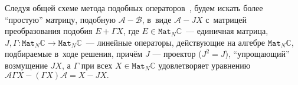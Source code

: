 \documentclass[14pt,a4paper]{extarticle}
\theoremstyle{definition}
\begin{document}
Следуя общей схеме метода подобных операторов~\cite{baskakov1986theorem,baskakov1987theorem,baskakov1994spectral,baskakov2002splitting},
будем искать более ``простую'' матрицу, подобную \( \mathcal{A} - \mathcal{B} \),
в~виде \( \mathcal{A} - J X \)
с~матрицей преобразования подобия \( E + \Gamma X \),
где \( E\in{\mathtt{Mat}_N\mathbb{C}} \)~--- единичная матрица,
\( J,\Gamma : \mathtt{Mat}_N\mathbb{C}\to\mathtt{Mat}_N\mathbb{C} \)~--- линейные операторы,
действующие на алгебре \( \mathtt{Mat}_N\mathbb{C} \), подбираемые
в~ходе решения,
      прич\"ем \( J \) --- проектор (\(J^2=J\)),
      ``упрощающий'' возмущение \( JX \),
      а \( \Gamma \)
      при всех \( X\in {\mathtt{Mat}_N\mathbb{C}} \) %
      удовлетворяет уравнению
          \( \mathcal{A}\Gamma X - (\Gamma X) \mathcal{A} = X - JX. \)

\end{document}
